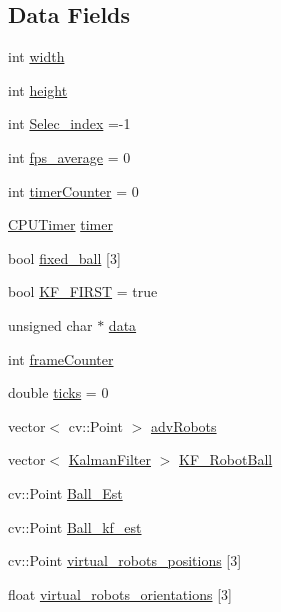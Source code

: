 \subsection*{Data Fields}
\begin{DoxyCompactItemize}
\item 
int \hyperlink{class_cam_cap_ac22698ba7ba278ffd8f7af7bd86a62c9}{width}
\item 
int \hyperlink{class_cam_cap_ab2c69bebfede0ba522b982b5f47b384e}{height}
\item 
int \hyperlink{class_cam_cap_a26dab6605daa1e18cdced96ea1ad5cbf}{Selec\+\_\+index} =-\/1
\item 
int \hyperlink{class_cam_cap_a01f1239b5e2b6478ebda3eac68c35bc1}{fps\+\_\+average} = 0
\item 
int \hyperlink{class_cam_cap_a074219feeb2cc1531246f45d8244ed0c}{timer\+Counter} = 0
\item 
\hyperlink{class_c_p_u_timer}{C\+P\+U\+Timer} \hyperlink{class_cam_cap_a2ea4ba1566017370f13057ec3d8b43ff}{timer}
\item 
bool \hyperlink{class_cam_cap_a19dab098186c6d30c93a68dd6b8da270}{fixed\+\_\+ball} \mbox{[}3\mbox{]}
\item 
bool \hyperlink{class_cam_cap_ada660167ec9872e8c91f0e8cf82028f0}{K\+F\+\_\+\+F\+I\+R\+ST} = true
\item 
unsigned char $\ast$ \hyperlink{class_cam_cap_a516da4047c872d26767e50fb09799400}{data}
\item 
int \hyperlink{class_cam_cap_a8a9611d808c20c937eb8a543bdf00cee}{frame\+Counter}
\item 
double \hyperlink{class_cam_cap_adfc9cd012ff6fa67497ffb0d32eb634e}{ticks} = 0
\item 
vector$<$ cv\+::\+Point $>$ \hyperlink{class_cam_cap_ae72873010cb7dae6e9842ccae917cae3}{adv\+Robots}
\item 
vector$<$ \hyperlink{class_kalman_filter}{Kalman\+Filter} $>$ \hyperlink{class_cam_cap_abf236d376a111567379a41ae29b3f644}{K\+F\+\_\+\+Robot\+Ball}
\item 
cv\+::\+Point \hyperlink{class_cam_cap_ae91debabf4943c74262acf6d60c6930f}{Ball\+\_\+\+Est}
\item 
cv\+::\+Point \hyperlink{class_cam_cap_a8e27afe151d46cfbf000fe900ce013b8}{Ball\+\_\+kf\+\_\+est}
\item 
cv\+::\+Point \hyperlink{class_cam_cap_afdbec56c1e17c308441cf2eaad035e45}{virtual\+\_\+robots\+\_\+positions} \mbox{[}3\mbox{]}
\item 
float \hyperlink{class_cam_cap_af7519e2b0d2139c7ef95482fa3c03c20}{virtual\+\_\+robots\+\_\+orientations} \mbox{[}3\mbox{]}

\end{DoxyCompactItemize}
